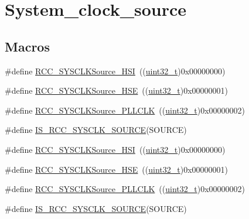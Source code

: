 \hypertarget{group___system__clock__source}{}\section{System\+\_\+clock\+\_\+source}
\label{group___system__clock__source}
\subsection*{Macros}
\begin{DoxyCompactItemize}
\item 
\#define \hyperlink{group___system__clock__source_ga0f392254e74dd965c48edd5aad148e20}{R\+C\+C\+\_\+\+S\+Y\+S\+C\+L\+K\+Source\+\_\+\+H\+SI}~((\hyperlink{_p_e___types_8h_a33594304e786b158f3fb30289278f5af}{uint32\+\_\+t})0x00000000)
\item 
\#define \hyperlink{group___system__clock__source_gabeae110e41833842f8620647ea0ce85a}{R\+C\+C\+\_\+\+S\+Y\+S\+C\+L\+K\+Source\+\_\+\+H\+SE}~((\hyperlink{_p_e___types_8h_a33594304e786b158f3fb30289278f5af}{uint32\+\_\+t})0x00000001)
\item 
\#define \hyperlink{group___system__clock__source_ga9301b7a07a7cb8c2c6ed87b619c1c966}{R\+C\+C\+\_\+\+S\+Y\+S\+C\+L\+K\+Source\+\_\+\+P\+L\+L\+C\+LK}~((\hyperlink{_p_e___types_8h_a33594304e786b158f3fb30289278f5af}{uint32\+\_\+t})0x00000002)
\item 
\#define \hyperlink{group___system__clock__source_gaae9d6172a72b0a90cb3703aa59258c57}{I\+S\+\_\+\+R\+C\+C\+\_\+\+S\+Y\+S\+C\+L\+K\+\_\+\+S\+O\+U\+R\+CE}(S\+O\+U\+R\+CE)
\item 
\#define \hyperlink{group___system__clock__source_ga0f392254e74dd965c48edd5aad148e20}{R\+C\+C\+\_\+\+S\+Y\+S\+C\+L\+K\+Source\+\_\+\+H\+SI}~((\hyperlink{_p_e___types_8h_a33594304e786b158f3fb30289278f5af}{uint32\+\_\+t})0x00000000)
\item 
\#define \hyperlink{group___system__clock__source_gabeae110e41833842f8620647ea0ce85a}{R\+C\+C\+\_\+\+S\+Y\+S\+C\+L\+K\+Source\+\_\+\+H\+SE}~((\hyperlink{_p_e___types_8h_a33594304e786b158f3fb30289278f5af}{uint32\+\_\+t})0x00000001)
\item 
\#define \hyperlink{group___system__clock__source_ga9301b7a07a7cb8c2c6ed87b619c1c966}{R\+C\+C\+\_\+\+S\+Y\+S\+C\+L\+K\+Source\+\_\+\+P\+L\+L\+C\+LK}~((\hyperlink{_p_e___types_8h_a33594304e786b158f3fb30289278f5af}{uint32\+\_\+t})0x00000002)
\item 
\#define \hyperlink{group___system__clock__source_gaae9d6172a72b0a90cb3703aa59258c57}{I\+S\+\_\+\+R\+C\+C\+\_\+\+S\+Y\+S\+C\+L\+K\+\_\+\+S\+O\+U\+R\+CE}(S\+O\+U\+R\+CE)
\end{DoxyCompactItemize}


